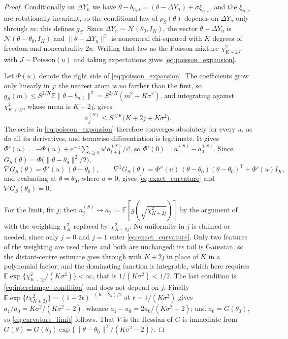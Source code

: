 \documentclass[11pt]{article}
\theoremstyle{definition}
\newcommand{\E}{\mathbb{E}}
\newcommand{\Normal}{\mathcal{N}}
\newcommand{\thetao}{\theta_0}
\begin{document}
\begin{proof}
Conditionally on $\Delta Y_n$ we have $\theta-b_{n,s}=(\theta-\Delta Y_n)+\sigma\xi_{n,s}$, and the $\xi_{n,s}$ are rotationally invariant, so the conditional law of $\rho_S(\theta)$ depends on $\Delta Y_n$ only through $m$; this defines $g_S$. Since $\Delta Y_n\sim\Normal(\thetao,I_K)$, the vector $\theta-\Delta Y_n$ is $\Normal(\theta-\thetao,I_K)$ and $\lVert\theta-\Delta Y_n\rVert^2$ is noncentral chi-squared with $K$ degrees of freedom and noncentrality $2u$. Writing that law as the Poisson mixture $\chi^2_{K+2J}$ with $J\sim\mathrm{Poisson}(u)$ and taking expectations gives \eqref{eq:poisson_expansion}.

Let $\Phi(u)$ denote the right side of \eqref{eq:poisson_expansion}. The coefficients grow only linearly in $j$: the nearest atom is no farther than the first, so $g_S(m)\le S^{2/K}\E\lVert\theta-b_{n,1}\rVert^2=S^{2/K}(m^2+K\sigma^2)$, and integrating against $\chi^2_{K+2j}$, whose mean is $K+2j$, gives
\begin{equation}\label{eq:a_growth}
a_j^{(S)}\le S^{2/K}\bigl(K+2j+K\sigma^2\bigr).
\end{equation}
The series in \eqref{eq:poisson_expansion} therefore converges absolutely for every $u$, as do all its derivatives, and termwise differentiation is legitimate. It gives $\Phi'(u)=-\Phi(u)+e^{-u}\sum_{i\ge0}u^ia_{i+1}^{(S)}/i!$, so $\Phi'(0)=a_1^{(S)}-a_0^{(S)}$. Since $G_S(\theta)=\Phi\bigl(\lVert\theta-\thetao\rVert^2/2\bigr)$,
\[
\nabla G_S(\theta)=\Phi'(u)\,(\theta-\thetao),
\qquad
\nabla^2G_S(\theta)=\Phi''(u)\,(\theta-\thetao)(\theta-\thetao)^{\mathsf T}+\Phi'(u)I_K ,
\]
and evaluating at $\theta=\thetao$, where $u=0$, gives \eqref{eq:exact_curvature} and $\nabla G_S(\thetao)=0$.

For the limit, fix $j$; then $a_j^{(S)}\to a_j:=\E[g(\sqrt{\chi^2_{K+2j}})]$ by the argument of  with the weighting $\chi^2_K$ replaced by $\chi^2_{K+2j}$. No uniformity in $j$ is claimed or needed, since only $j=0$ and $j=1$ enter \eqref{eq:exact_curvature}. Only two features of the weighting are used there and both are unchanged: its tail is Gaussian, so the distant-centre estimate goes through with $K+2j$ in place of $K$ in a polynomial factor; and the dominating function is integrable, which here requires $\E\exp\{\chi^2_{K+2j}/(K\sigma^2)\}<\infty$, that is $1/(K\sigma^2)<1/2$. The last condition is \eqref{eq:interchange_condition} and does not depend on $j$. Finally $\E\exp\{t\chi^2_{K+2j}\}=(1-2t)^{-(K+2j)/2}$ at $t=1/(K\sigma^2)$ gives $a_1/a_0=K\sigma^2/(K\sigma^2-2)$, whence $a_1-a_0=2a_0/(K\sigma^2-2)$; and $a_0=G(\thetao)$, so \eqref{eq:curvature_limit} follows. That $V$ is the Hessian of $G$ is immediate from $G(\theta)=G(\thetao)\exp\{\lVert\theta-\thetao\rVert^2/(K\sigma^2-2)\}$.
\end{proof}
\end{document}
